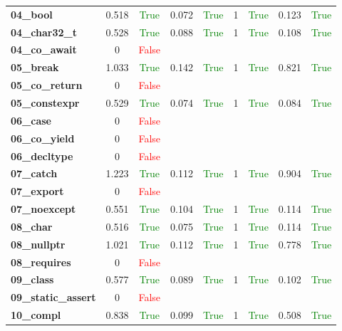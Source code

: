 \documentclass{article}
\begin{document}
\begin{xltabular}{\textwidth}{lcccccccc}
\textbf{04\_bool}& 0.518&\textcolor{green}{True}& 0.072&\textcolor{green}{True}& 1&\textcolor{green}{True}& 0.123&\textcolor{green}{True} \\[0.5ex]
\textbf{04\_char32\_t}& 0.528&\textcolor{green}{True}& 0.088&\textcolor{green}{True}& 1&\textcolor{green}{True}& 0.108&\textcolor{green}{True} \\[0.5ex]
\textbf{04\_co\_await}& 0&\textcolor{red}{False} \\[0.5ex]
\textbf{05\_break}& 1.033&\textcolor{green}{True}& 0.142&\textcolor{green}{True}& 1&\textcolor{green}{True}& 0.821&\textcolor{green}{True} \\[0.5ex]
\textbf{05\_co\_return}& 0&\textcolor{red}{False} \\[0.5ex]
\textbf{05\_constexpr}& 0.529&\textcolor{green}{True}& 0.074&\textcolor{green}{True}& 1&\textcolor{green}{True}& 0.084&\textcolor{green}{True} \\[0.5ex]
\textbf{06\_case}& 0&\textcolor{red}{False} \\[0.5ex]
\textbf{06\_co\_yield}& 0&\textcolor{red}{False} \\[0.5ex]
\textbf{06\_decltype}& 0&\textcolor{red}{False} \\[0.5ex]
\textbf{07\_catch}& 1.223&\textcolor{green}{True}& 0.112&\textcolor{green}{True}& 1&\textcolor{green}{True}& 0.904&\textcolor{green}{True} \\[0.5ex]
\textbf{07\_export}& 0&\textcolor{red}{False} \\[0.5ex]
\textbf{07\_noexcept}& 0.551&\textcolor{green}{True}& 0.104&\textcolor{green}{True}& 1&\textcolor{green}{True}& 0.114&\textcolor{green}{True} \\[0.5ex]
\textbf{08\_char}& 0.516&\textcolor{green}{True}& 0.075&\textcolor{green}{True}& 1&\textcolor{green}{True}& 0.114&\textcolor{green}{True} \\[0.5ex]
\textbf{08\_nullptr}& 1.021&\textcolor{green}{True}& 0.112&\textcolor{green}{True}& 1&\textcolor{green}{True}& 0.778&\textcolor{green}{True} \\[0.5ex]
\textbf{08\_requires}& 0&\textcolor{red}{False} \\[0.5ex]
\textbf{09\_class}& 0.577&\textcolor{green}{True}& 0.089&\textcolor{green}{True}& 1&\textcolor{green}{True}& 0.102&\textcolor{green}{True} \\[0.5ex]
\textbf{09\_static\_assert}& 0&\textcolor{red}{False} \\[0.5ex]
\textbf{10\_compl}& 0.838&\textcolor{green}{True}& 0.099&\textcolor{green}{True}& 1&\textcolor{green}{True}& 0.508&\textcolor{green}{True} \\[0.5ex]

\end{xltabular}
\end{document}
